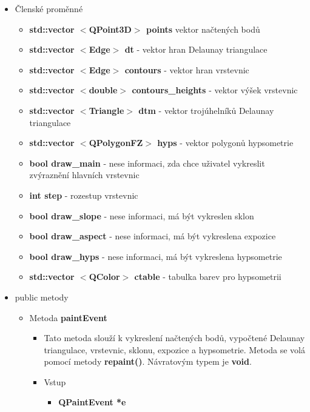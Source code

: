 \documentclass[a4paper, 12pt]{article}
\begin{document}
\begin{itemize}
	\item Členské proměnné
		\begin{itemize}
			\item \textbf{std::vector $<$QPoint3D$>$ points } vektor načtených bodů
			\item \textbf{std::vector $<$Edge$>$ dt }- vektor hran Delaunay triangulace
			\item \textbf{std::vector $<$Edge$>$ contours} - vektor hran vrstevnic
			\item \textbf{std::vector $<$double$>$ contours\_heights} - vektor výšek vrstevnic
			\item \textbf{std::vector $<$Triangle$>$ dtm} - vektor trojúhelníků Delaunay triangulace
			\item \textbf{std::vector $<$QPolygonFZ$>$ hyps} - vektor polygonů hypsometrie
			\item \textbf{bool draw\_main} - nese informaci, zda chce uživatel vykreslit zvýraznění hlavních vrstevnic
			\item \textbf{int step} - rozestup vrstevnic
			\item \textbf{bool draw\_slope} - nese informaci, má být vykreslen sklon
			\item \textbf{bool draw\_aspect} - nese informaci, má být vykreslena expozice
			\item \textbf{bool draw\_hyps} - nese informaci, má být vykreslena hypsometrie
			\item \textbf{std::vector $<$QColor$>$ ctable} - tabulka barev pro hypsometrii
		\end{itemize}
	



	\item public metody
	\begin{itemize}
	\item Metoda \textbf{paintEvent}
		\begin{itemize}
			\item Tato metoda slouží k vykreslení načtených bodů, vypočtené Delaunay triangulace, vrstevnic, sklonu, expozice a hypsometrie. Metoda se volá pomocí metody \textbf{repaint()}. Návratovým typem je \textbf{void}.
			\item Vstup
				\begin{itemize}
					\item \textbf{QPaintEvent *e}
				\end{itemize}
		\end{itemize}


\end{itemize}
\end{itemize}
\end{document}
